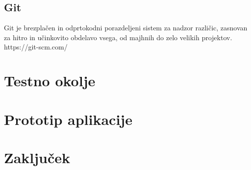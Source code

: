 \documentclass[a4paper, 12pt]{book}
\begin{document}
\section{Git}
Git je brezplačen in odprtokodni porazdeljeni sistem za nadzor različic, zasnovan za hitro in učinkovito obdelavo vsega, od majhnih do zelo velikih projektov.
https://git-scm.com/



\chapter{Testno okolje}
\label{ch3}



\chapter{Prototip aplikacije}
\label{ch4}


\chapter{Zaključek}
\label{stroka}


\clearpage
{}


\end{document}
